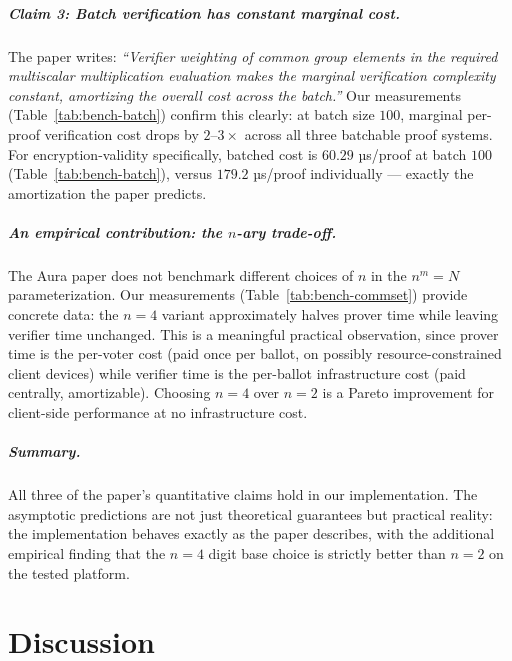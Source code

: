 \documentclass[12pt,a4paper,oneside]{report}
\begin{document}
\paragraph{Claim 3: Batch verification has constant marginal cost.}
The paper writes: \emph{``Verifier weighting of common group elements in 
the required multiscalar multiplication evaluation makes the marginal 
verification complexity constant, amortizing the overall cost across 
the batch.''} Our measurements (Table~\ref{tab:bench-batch}) confirm 
this clearly: at batch size $100$, marginal per-proof verification cost 
drops by $2$--$3\times$ across all three batchable proof systems. For 
encryption-validity specifically, batched cost is $60.29$ µs/proof at
batch $100$ (Table~\ref{tab:bench-batch}), versus $179.2$ µs/proof
individually --- exactly the amortization the paper predicts.

\paragraph{An empirical contribution: the $n$-ary trade-off.}
The Aura paper does not benchmark different choices of $n$ in the 
$n^m = N$ parameterization. Our measurements (Table~\ref{tab:bench-commset}) 
provide concrete data: the $n = 4$ variant approximately halves prover 
time while leaving verifier time unchanged. This is a meaningful 
practical observation, since prover time is the per-voter cost (paid 
once per ballot, on possibly resource-constrained client devices) while 
verifier time is the per-ballot infrastructure cost (paid centrally, 
amortizable). Choosing $n = 4$ over $n = 2$ is a Pareto improvement 
for client-side performance at no infrastructure cost.

\paragraph{Summary.}
All three of the paper's quantitative claims hold in our implementation. 
The asymptotic predictions are not just theoretical guarantees but 
practical reality: the implementation behaves exactly as the paper 
describes, with the additional empirical finding that the $n = 4$ digit 
base choice is strictly better than $n = 2$ on the tested platform.
\chapter{Discussion}
\label{ch:discussion}
\end{document}
